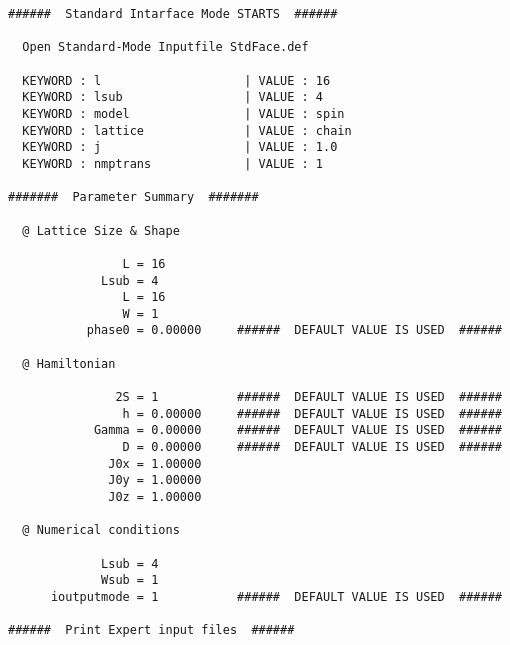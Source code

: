 \small
\begin{verbatim}
######  Standard Intarface Mode STARTS  ######

  Open Standard-Mode Inputfile StdFace.def 

  KEYWORD : l                    | VALUE : 16 
  KEYWORD : lsub                 | VALUE : 4 
  KEYWORD : model                | VALUE : spin 
  KEYWORD : lattice              | VALUE : chain 
  KEYWORD : j                    | VALUE : 1.0 
  KEYWORD : nmptrans             | VALUE : 1 

#######  Parameter Summary  #######

  @ Lattice Size & Shape

                L = 16 
             Lsub = 4         
                L = 16        
                W = 1         
           phase0 = 0.00000     ######  DEFAULT VALUE IS USED  ######

  @ Hamiltonian 

               2S = 1           ######  DEFAULT VALUE IS USED  ######
                h = 0.00000     ######  DEFAULT VALUE IS USED  ######
            Gamma = 0.00000     ######  DEFAULT VALUE IS USED  ######
                D = 0.00000     ######  DEFAULT VALUE IS USED  ######
              J0x = 1.00000   
              J0y = 1.00000   
              J0z = 1.00000   

  @ Numerical conditions

             Lsub = 4         
             Wsub = 1         
      ioutputmode = 1           ######  DEFAULT VALUE IS USED  ######

######  Print Expert input files  ######


\end{verbatim}

